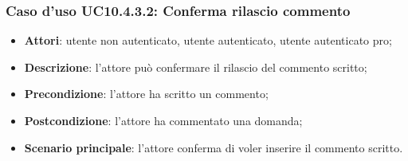 \subsubsection{Caso d'uso UC10.4.3.2: Conferma rilascio commento}
	\begin{itemize}
		\item \textbf{Attori}: utente non autenticato, utente autenticato, utente autenticato pro;
		\item \textbf{Descrizione}: l'attore può confermare il rilascio del commento scritto;
		\item \textbf{Precondizione}: l'attore ha scritto un commento;
		\item \textbf{Postcondizione}: l'attore ha commentato una domanda;
		\item \textbf{Scenario principale}: l'attore conferma di voler inserire il commento scritto.
	\end{itemize}
